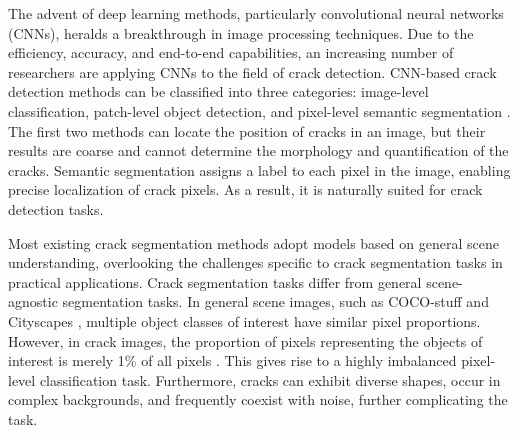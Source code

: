 \documentclass[preprint,12pt,authoryear]{elsarticle}
\begin{document}
The advent of deep learning methods, particularly convolutional neural networks (CNNs), heralds a breakthrough in image processing techniques. Due to the efficiency, accuracy, and end-to-end capabilities, an increasing number of researchers are applying CNNs to the field of crack detection. CNN-based crack detection methods can be classified into three categories: image-level classification, patch-level object detection, and pixel-level semantic segmentation \citep{hsieh_machine_2020}. The first two methods can locate the position of cracks in an image, but their results are coarse and cannot determine the morphology and quantification of the cracks. Semantic segmentation assigns a label to each pixel in the image, enabling precise localization of crack pixels. As a result, it is naturally suited for crack detection tasks.




Most existing crack segmentation methods adopt models based on general scene understanding, overlooking the challenges specific to crack segmentation tasks in practical applications. Crack segmentation tasks differ from general scene-agnostic segmentation tasks. In general scene images, such as COCO-stuff \citep{caesar_coco-stuff_2018} and Cityscapes \citep{cordts_cityscapes_2016}, multiple object classes of interest have similar pixel proportions. However, in crack images, the proportion of pixels representing the objects of interest is merely 1\% of all pixels \citep{xu_pixel-level_2021}. This gives rise to a highly imbalanced pixel-level classification task. Furthermore, cracks can exhibit diverse shapes, occur in complex backgrounds, and frequently coexist with noise, further complicating the task.
\end{document}

